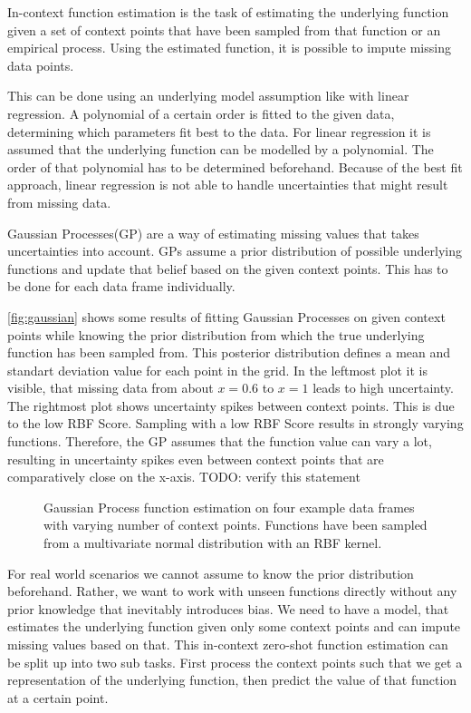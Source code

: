 In-context function estimation is the task of estimating the underlying function given a set of context points that have been sampled from that function or an empirical process. Using the estimated function, it is possible to impute missing data points. \cite{seifner2025zeroshotimputationfoundationinference}

This can be done using an underlying model assumption like with linear regression. A polynomial of a certain order is fitted to the given data, determining which parameters fit best to the data. For linear regression it is assumed that the underlying function can be modelled by a polynomial. The order of that polynomial has to be determined beforehand. Because of the best fit approach, linear regression is not able to handle uncertainties that might result from missing data.

Gaussian Processes(GP) are a way of estimating missing values that takes uncertainties into account. GPs assume a prior distribution of possible underlying functions and update that belief based on the given context points. This has to be done for each data frame individually. \cite{garnelo2018neural}

\autoref{fig:gaussian} shows some results of fitting Gaussian Processes on given context points while knowing the prior distribution from which the true underlying function has been sampled from. This posterior distribution defines a mean and standart deviation value for each point in the grid. In the leftmost plot it is visible, that missing data from about $x=0.6$ to $x=1$ leads to high uncertainty. The rightmost plot shows uncertainty spikes between context points. This is due to the low RBF Score. Sampling with a low RBF Score results in strongly varying functions. Therefore, the GP assumes that the function value can vary a lot, resulting in uncertainty spikes even between context points that are comparatively close on the x-axis. TODO: verify this statement 

\begin{figure*}
	\centering
	\resizebox{0.90\textwidth}{!}{
		
		
		
	}
\caption{Gaussian Process function estimation on four example data frames with varying number of context points. Functions have been sampled from a multivariate normal distribution with an RBF kernel.}
\label{fig:gaussian}
\end{figure*}

For real world scenarios we cannot assume to know the prior distribution beforehand. Rather, we want to work with unseen functions directly without any prior knowledge that inevitably introduces bias. We need to have a model, that estimates the underlying function given only some context points and can impute missing values based on that. This in-context zero-shot function estimation can be split up into two sub tasks. First process the context points such that we get a representation of the underlying function, then predict the value of that function at a certain point.

